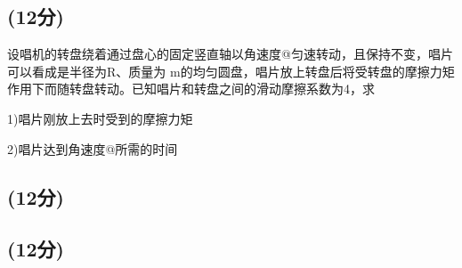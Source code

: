 \subsection{(12分)}
设唱机的转盘绕着通过盘心的固定竖直轴以角速度@匀速转动，且保持不变，唱片可以看成是半径为R、质量为 m的均匀圆盘，唱片放上转盘后将受转盘的摩擦力矩作用下而随转盘转动。已知唱片和转盘之间的滑动摩擦系数为4，求

1)唱片刚放上去时受到的摩擦力矩

2)唱片达到角速度@所需的时间
\subsection{(12分)}

\subsection{(12分)}